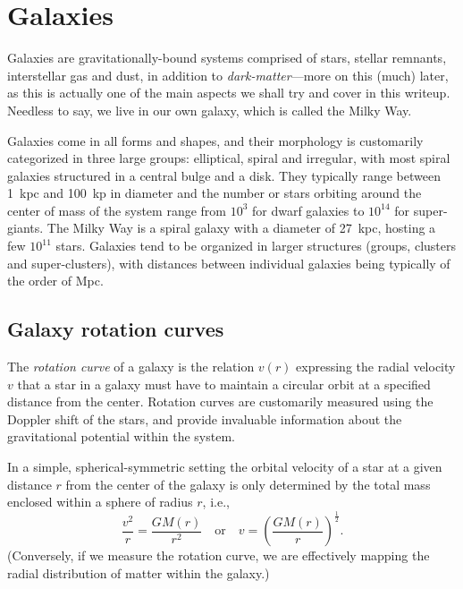 


\section{Galaxies}
\label{sec:galaxies}

Galaxies are gravitationally-bound systems comprised of stars, stellar remnants,
interstellar gas and dust, in addition to \emph{dark-matter}---more on this (much)
later, as this is actually one of the main aspects we shall try and cover in this
writeup. Needless to say, we live in our own galaxy, which is called the Milky Way.

Galaxies come in all forms and shapes, and their morphology is customarily categorized
in three large groups: elliptical, spiral and irregular, with most spiral galaxies
structured in a central bulge and a disk. They typically range between 1~kpc and
100~kp in diameter and the number or stars orbiting around the center of mass of
the system range from $10^3$ for dwarf galaxies to $10^{14}$ for super-giants.
The Milky Way is a spiral galaxy with a diameter of 27~kpc, hosting a few $10^{11}$
stars. Galaxies tend to be organized in larger structures (groups, clusters and
super-clusters), with distances between individual galaxies being typically of
the order of Mpc.


\subsection{Galaxy rotation curves}

The \emph{rotation curve} of a galaxy is the relation $v(r)$ expressing the radial
velocity $v$ that a star in a galaxy must have to maintain a circular orbit at a
specified distance from the center. Rotation curves are customarily measured using the
Doppler shift of the stars, and provide invaluable information about the gravitational
potential within the system.

In a simple, spherical-symmetric setting the orbital velocity of a star at a given
distance $r$ from the center of the galaxy is only determined by the total mass
enclosed within a sphere of radius $r$, i.e.,
\begin{equation*}
  \frac{v^2}{r} = \frac{G M(r)}{r^2}
  \quad\text{or}\quad
  v = \left(\frac{GM(r)}{r}\right)^\frac{1}{2}.
\end{equation*}
(Conversely, if we measure the rotation curve, we are effectively mapping the radial
distribution of matter within the galaxy.)

